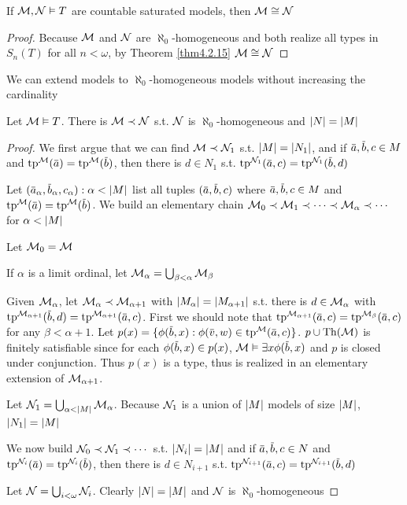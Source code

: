 \documentclass[11pt]{article}
\begin{document}
\begin{corollary}[]
\label{cor4.3.5}
If \(\mathcal{M},\mathcal{N}\vDash T\) are countable saturated models, then \(\mathcal{M}\cong\mathcal{N}\)
\end{corollary}

\begin{proof}
Because \(\mathcal{M}\) and \(\mathcal{N}\) are \(\aleph_0\)-homogeneous and both realize all types in \(S_n(T)\) for
all \(n<\omega\), by Theorem \ref{thm4.2.15} \(\mathcal{M}\cong\mathcal{N}\)
\end{proof}

We can extend models to \(\aleph_0\)-homogeneous models without increasing the cardinality

\begin{proposition}[]
\label{prop4.3.6}
Let \(\mathcal{M}\vDash T\). There is \(\mathcal{M}\prec\mathcal{N}\) s.t. \(\mathcal{N}\) is \(\aleph_0\)-homogeneous and \(\abs{N}=\abs{M}\)
\end{proposition}

\begin{proof}
We first argue that we can find \(\mathcal{M}\prec\mathcal{N}_1\) s.t. \(\abs{M}=\abs{N_1}\), and if \(\bara,\barb,c\in M\)
and \(\tp^{\calm}(\bara)=\tp^{\calm}(\barb)\), then there is \(d\in N_1\)
s.t. \(\tp^{\caln_1}(\bara,c)=\tp^{\caln_1}(\barb,d)\)

Let \((\bara_\alpha,\barb_\alpha,c_\alpha):\alpha<\abs{M}\) list all tuples \((\bara,\barb,c)\)
where \(\bara,\barb,c\in M\) and \(\tp^{\calm}(\bara)=\tp^{\calm}(\barb)\). We build an elementary
chain \(\mathcal{M}_0\prec\mathcal{M}_1\prec\dots\prec\mathcal{M}_\alpha\prec\cdots\) for \(\alpha<\abs{M}\)

Let \(\mathcal{M}_0=\mathcal{M}\)

If \(\alpha\) is a limit ordinal, let \(\mathcal{M}_\alpha=\bigcup_{\beta<\alpha}\mathcal{M}_\beta\)

Given \(\mathcal{M}_\alpha\), let \(\mathcal{M}_\alpha\prec\mathcal{M}_{\alpha+1}\) with \(\abs{M_\alpha}=\abs{M_{\alpha+1}}\) s.t. there is \(d\in\mathcal{M}_\alpha\)
with \(\tp^{\calm_{\alpha+1}}(\barb,d)=\tp^{\calm_{\alpha+1}}(\bara,c)\). First we should note
that \(\tp^{\calm_{\alpha+1}}(\bara,c)=\tp^{\calm_\beta}(\bara,c)\) for any \(\beta<\alpha+1\).
Let \(p(x)=\{\phi(\barb,x):\phi(\barv,w)\in\tp^{\calm}(\bara,c)\}\). \(p\cup\operatorname{Th}(\mathcal{M})\) is finitely satisfiable
since for each \(\phi(\barb,x)\in p(x)\), \(\calm\vDash\exists x\phi(\barb,x)\) and \(p\) is closed under conjunction.
Thus \(p(x)\) is a type, thus is realized in an elementary extension of \(\mathcal{M}_{\alpha+1}\).


Let \(\caln_1=\bigcup_{\alpha<\abs{M}}\calm_\alpha\).
Because \(\mathcal{N}_1\) is a union of \(\abs{M}\) models of size \(\abs{M}\), \(\abs{N_1}=\abs{M}\)

We now build \(\mathcal{N}_0\prec\mathcal{N}_1\prec\cdots\) s.t. \(\abs{N_i}=\abs{M}\) and if \(\bara,\barb,c\in N\)
and \(\tp^{\caln_i}(\bara)=\tp^{\caln_i}(\barb)\), then there is \(d\in N_{i+1}\)
s.t. \(\tp^{\caln_{i+1}}(\bara,c)=\tp^{\caln_{i+1}}(\barb,d)\)

Let \(\mathcal{N}=\bigcup_{i<\omega}\mathcal{N}_i\). Clearly \(\abs{N}=\abs{M}\) and \(\mathcal{N}\) is \(\aleph_0\)-homogeneous
\end{proof}
\end{document}

